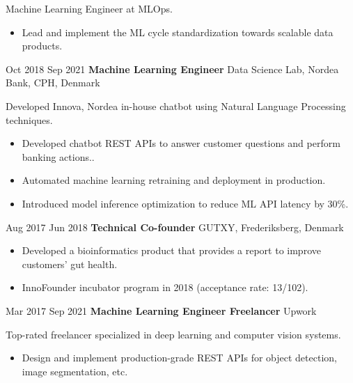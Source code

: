 \documentclass[11pt]{article} %
\begin{document}
{{	Machine Learning Engineer at MLOps.
	\begin{itemize}[itemsep=0pt]
		\item Lead and implement the ML cycle standardization towards scalable data products.
	\end{itemize}
}
\job
{Oct 2018 }{Sep 2021}
{\textbf{Machine Learning Engineer}}
{}
{Data Science Lab, Nordea Bank, CPH, Denmark}
{
 
    Developed Innova, Nordea in-house chatbot using Natural Language Processing techniques.
    \begin{itemize}[itemsep=0pt]
    	\item  Developed chatbot REST APIs to answer customer questions and perform banking actions..
    	\item  Automated machine learning retraining and deployment in production.
    	\item  Introduced model inference optimization to reduce ML API latency by 30\%.
    \end{itemize}
}

\job
{Aug 2017 }{Jun 2018}
{\textbf{Technical Co-founder}}
{}
{GUTXY, Frederiksberg, Denmark}
{
	\begin{itemize}[itemsep=0pt]
		\item Developed a bioinformatics product that provides a report to improve customers’ gut health.
		\item InnoFounder incubator program in 2018 (acceptance rate: 13/102).
	\end{itemize}
}

\job
{Mar 2017 }{Sep 2021}
{\textbf{Machine Learning Engineer Freelancer}}
{}
{Upwork}
{
	Top-rated freelancer specialized in deep learning and computer vision systems.
		\begin{itemize}[itemsep=0pt]
			\item Design and implement production-grade REST APIs for object detection, image segmentation, etc.
		\end{itemize}
}

}
\end{document}
